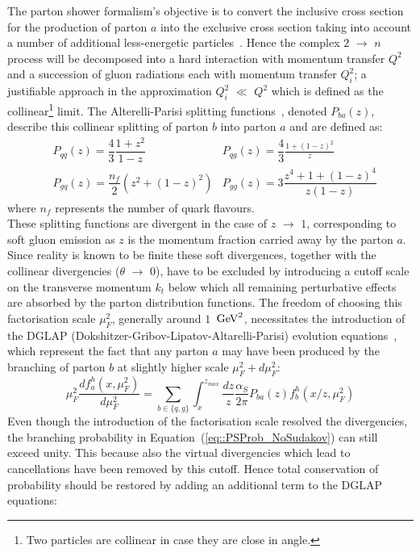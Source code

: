 The parton shower formalism's objective is to convert the inclusive cross section for the production of parton $a$ into the exclusive cross section taking into account a number of additional less-energetic particles~\cite{Hoche:2014rga}.
Hence the complex $2$ $\rightarrow$ $n$ process will be decomposed into a hard interaction with momentum transfer $Q^{2}$ and a succession of gluon radiations each with momentum transfer $Q^{2}_{i}$; a justifiable approach in the approximation $Q_{i}^{2}$ $\ll$ $Q^2$ which is defined as the collinear\footnote{Two particles are collinear in case they are close in angle.} limit. 
The Alterelli-Parisi splitting functions~\cite{Altarelli:1977zs}, denoted $P_{ba}(z)$, describe this collinear splitting of parton $b$ into parton $a$ and are defined as:
\begin{eqnarray}
 & P_{qq}(z) = \dfrac{4}{3} \dfrac{1+z^{2}}{1-z}    & P_{qg}(z) = \dfrac{4}{3} \frac{1+(1-z)^{2}}{z} \\
 & P_{gq}(z) = \dfrac{n_{f}}{2} (z^{2} + (1-z)^{2}) & P_{gg}(z) = 3 \dfrac{z^{4}+1+(1-z)^{4}}{z(1-z)}
\end{eqnarray}
where $n_{f}$ represents the number of quark flavours.
\\
These splitting functions are divergent in the case of $z$ $\rightarrow$ $1$, corresponding to soft gluon emission as $z$ is the momentum fraction carried away by the parton $a$. 
Since reality is known to be finite these soft divergences, together with the collinear divergencies ($\theta$ $\rightarrow$ $0$), have to be excluded by introducing a cutoff scale on the transverse momentum $k_{t}$ below which all remaining perturbative effects are absorbed by the parton distribution functions. 
The freedom of choosing this factorisation scale $\mu_{F}^{2}$, generally around $1$ $\, \mathrm{GeV}^{2}$, necessitates the introduction of the DGLAP (Dokshitzer-Gribov-Lipatov-Altarelli-Parisi) evolution equations~\cite{Gribov:1972ri, Dokshitzer:1977sg}, which represent the fact that any parton $a$ may have been produced by the branching of parton $b$ at slightly higher scale $\mu_{F}^2 + d\mu_{F}^2$:\\
\begin{equation}\label{eq::PSProb_NoSudakov}
 \mu_{F}^2 \dfrac{d f_{a}^{h}(x,\mu_{F}^{2})}{d \mu_{F}^{2}} = \sum_{b \in \{q,g\} } \int_{x}^{z_{max}} \dfrac{dz}{z} \dfrac{\alpha_{S}}{2 \pi} P_{ba}(z) f_{b}^{h}(x/z, \mu_{F}^{2})
\end{equation}
Even though the introduction of the factorisation scale resolved the divergencies, the branching probability in Equation~(\ref{eq::PSProb_NoSudakov}) can still exceed unity. This because also the virtual divergencies which lead to cancellations have been removed by this cutoff. Hence total conservation of probability should be restored by adding an additional term to the DGLAP equations:
